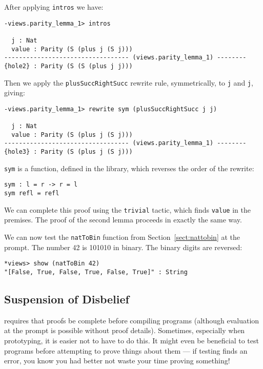\noindent
After applying \texttt{intros} we have:

\begin{lstlisting}[style=stdout]
-views.parity_lemma_1> intros

  j : Nat
  value : Parity (S (plus j (S j)))
---------------------------------- (views.parity_lemma_1) --------
{hole2} : Parity (S (S (plus j j)))
\end{lstlisting}

\noindent
Then we apply the \texttt{plusSuccRightSucc} rewrite rule, symmetrically, to \texttt{j} and \texttt{j}, giving:

\begin{lstlisting}[style=stdout]
-views.parity_lemma_1> rewrite sym (plusSuccRightSucc j j) 

  j : Nat
  value : Parity (S (plus j (S j)))
---------------------------------- (views.parity_lemma_1) --------
{hole3} : Parity (S (plus j (S j)))
\end{lstlisting}

\noindent
\texttt{sym} is a function, defined in the library, which reverses the order of the rewrite:

\begin{lstlisting}[style=stdout]
sym : l = r -> r = l
sym refl = refl
\end{lstlisting} 

\noindent
We can complete this proof using the \texttt{trivial} tactic, which finds  \texttt{value} in the premises.
The proof of the second lemma proceeds in exactly the same way.

We can now test the \texttt{natToBin} function from Section~\ref{sect:nattobin} at the prompt.
The number 42 is 101010 in binary.
The binary digits are reversed:

\begin{lstlisting}[style=stdout]
*views> show (natToBin 42)
"[False, True, False, True, False, True]" : String
\end{lstlisting}


\subsection{Suspension of Disbelief}

\Idris{} requires that proofs be complete before compiling programs (although evaluation at the prompt is possible without proof details). 
Sometimes, especially when prototyping, it is easier not to have to do this.
It might even be beneficial to test programs before attempting to prove things about them --- if testing finds an error, you know you had better not waste your time proving something!

